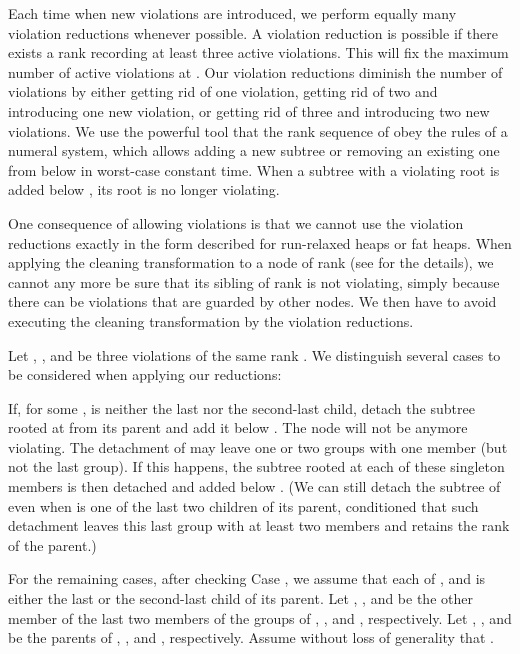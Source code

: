 \documentclass{llncs}
\begin{document}
Each time when new violations are introduced, we perform equally many
violation reductions whenever possible. A violation reduction is
possible if there exists a rank recording at least three active
violations. This will fix the maximum number of active violations at
. Our violation reductions diminish the number of violations
by either getting rid of one violation, getting rid of two and
introducing one new violation, or getting rid of three and introducing
two new violations.  We use the powerful tool that the rank sequence
of  obey the rules of a numeral system, which allows adding a new
subtree or removing an existing one from below  in worst-case
constant time.  When a subtree with a violating root is added below
, its root is no longer violating.

One consequence of allowing  violations is that we cannot use
the violation reductions exactly in the form described for run-relaxed
heaps or fat heaps.  When applying the cleaning transformation
to a node of rank  (see \cite{DGST88} for the details), we cannot
any more be sure that its sibling of rank  is not
violating, simply because there can be violations that are guarded by other nodes.  
We then have to avoid executing the cleaning transformation by the violation reductions.
 
Let , , and  be three violations of the same rank . 
We distinguish several cases to be considered when applying our reductions:

\begin{description}
\vspace{-.1in}
\item[Case 1.] If, for some ,  is neither the last nor the 
	second-last child, detach the subtree rooted at  from its parent and add it below . 
	The node  will not be anymore violating. The detachment of  may leave one or two groups with one member (but not the last group).
	If this happens, the subtree rooted at each of these singleton members is then detached and added below .
	(We can still detach the subtree of  even when  is one of the last two children of its parent,
	conditioned that such detachment leaves this last group with at least two members and retains the rank of the parent.) 
\end{description}

For the remaining cases, after checking Case , we assume that each of , and  
is either the last or the second-last child of its parent.
Let , , and  be the other member of the last two
members of the groups of , , and , respectively. Let
, , and  be the parents of , , and ,
respectively.  Assume without loss of generality that .
\end{document}
